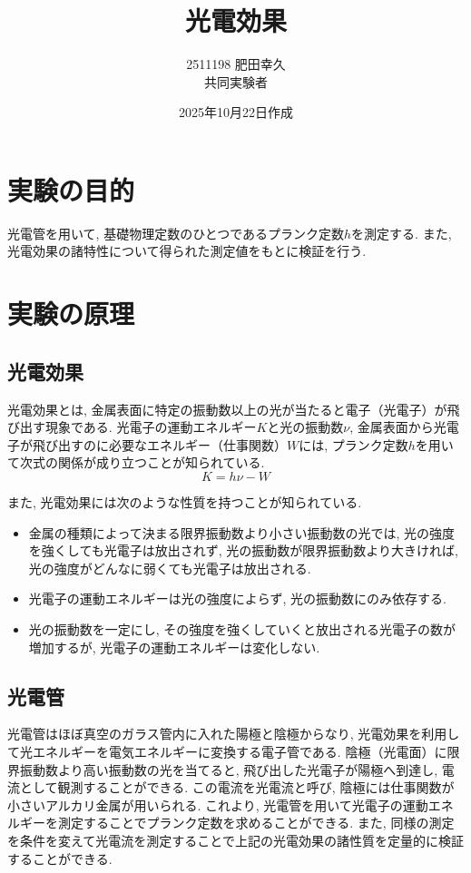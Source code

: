 \documentclass{jarticle}
\title{光電効果}
\author{2511198 肥田幸久 \\ 共同実験者 \\ }
\date{2025年10月22日作成}
\begin{document}
\maketitle



\section{実験の目的}

光電管を用いて, 基礎物理定数のひとつであるプランク定数$h$を測定する.
また, 光電効果の諸特性について得られた測定値をもとに検証を行う.



\section{実験の原理}



\subsection{光電効果}

光電効果とは, 金属表面に特定の振動数以上の光が当たると電子（光電子）が飛び出す現象である.
光電子の運動エネルギー$K$と光の振動数$\nu$, 金属表面から光電子が飛び出すのに必要なエネルギー（仕事関数）$W$には, プランク定数$h$を用いて次式の関係が成り立つことが知られている.
\begin{equation}
  K = h\nu - W
\end{equation}

また, 光電効果には次のような性質を持つことが知られている.
\begin{itemize}
  \item 金属の種類によって決まる限界振動数より小さい振動数の光では, 光の強度を強くしても光電子は放出されず, 光の振動数が限界振動数より大きければ, 光の強度がどんなに弱くても光電子は放出される.
  \item 光電子の運動エネルギーは光の強度によらず, 光の振動数にのみ依存する.
  \item 光の振動数を一定にし, その強度を強くしていくと放出される光電子の数が増加するが, 光電子の運動エネルギーは変化しない.
\end{itemize}



\subsection{光電管}

光電管はほぼ真空のガラス管内に入れた陽極と陰極からなり, 光電効果を利用して光エネルギーを電気エネルギーに変換する電子管である.
陰極（光電面）に限界振動数より高い振動数の光を当てると, 飛び出した光電子が陽極へ到達し, 電流として観測することができる.
この電流を光電流と呼び, 陰極には仕事関数が小さいアルカリ金属が用いられる.
これより, 光電管を用いて光電子の運動エネルギーを測定することでプランク定数を求めることができる.
また, 同様の測定を条件を変えて光電流を測定することで上記の光電効果の諸性質を定量的に検証することができる.
\end{document}
